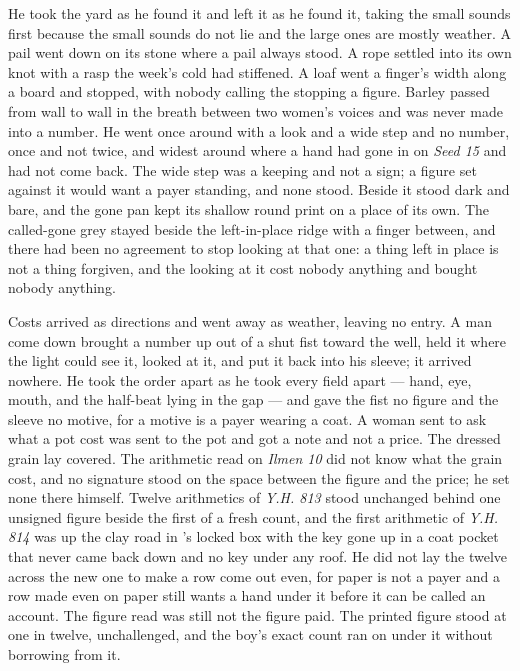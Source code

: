 He took the yard as he found it and left it as he found it, taking the small sounds first because the small sounds do not lie and the large ones are mostly weather. A pail went down on its stone where a pail always stood. A rope settled into its own knot with a rasp the week's cold had stiffened. A loaf went a finger's width along a board and stopped, with nobody calling the stopping a figure. Barley passed from wall to wall in the breath between two women's voices and was never made into a number. He went once around  with a look and a wide step and no number, once and not twice, and widest around  where a hand had gone in on \emph{Seed 15} and had not come back. The wide step was a keeping and not a sign; a figure set against it would want a payer standing, and none stood. Beside it  stood dark and bare, and the gone pan kept its shallow round print on a place of its own. The called-gone grey stayed beside the left-in-place ridge with a finger between, and there had been no agreement to stop looking at that one: a thing left in place is not a thing forgiven, and the looking at it cost nobody anything and bought nobody anything.

Costs arrived as directions and went away as weather, leaving no entry. A man come down  brought a number up out of a shut fist toward the well, held it where the light could see it, looked at it, and put it back into his sleeve; it arrived nowhere. He took the order apart as he took every field apart --- hand, eye, mouth, and the half-beat lying in the gap --- and gave the fist no figure and the sleeve no motive, for a motive is a payer wearing a coat. A woman sent to ask what a pot cost was sent to the pot and got a note and not a price. The dressed grain lay covered. The arithmetic read on \emph{Ilmen 10} did not know what the grain cost, and no signature stood on the space between the figure and the price; he set none there himself. Twelve arithmetics of \emph{Y.H. 813} stood unchanged behind one unsigned figure beside the first of a fresh count, and the first arithmetic of \emph{Y.H. 814} was up the clay road in 's locked box with the key gone up in a coat pocket that never came back down and no key under any roof. He did not lay the twelve across the new one to make a row come out even, for paper is not a payer and a row made even on paper still wants a hand under it before it can be called an account. The figure read was still not the figure paid. The printed figure stood at one in twelve, unchallenged, and the boy's exact count ran on under it without borrowing from it.

